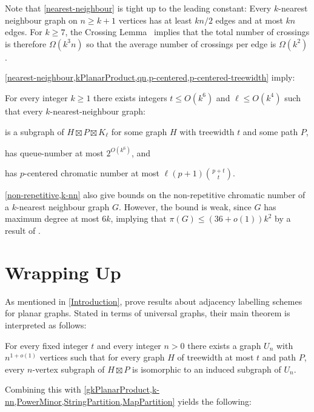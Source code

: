 \documentclass{patmorin}
\renewcommand{\ge}{\geqslant}
\renewcommand{\geq}{\geqslant}
\renewcommand{\leq}{\leqslant}
\begin{document}
Note that \cref{nearest-neighbour} is tight up to the leading constant:  Every $k$-nearest neighbour graph on $n\ge k+1$ vertices has at least $kn/2$ edges and at most $kn$ edges.  For $k\ge 7$, the Crossing Lemma~\citep{ajtai.chvatal.ea:crossing-free,leighton:complexity} implies that the total number of crossings is therefore $\Omega(k^3n)$ so that the average number of crossings per edge is $\Omega(k^2)$.

\cref{nearest-neighbour,kPlanarProduct,qn,p-centered,p-centered-treewidth} imply:

\begin{cor}
\label{k-nn}
For every integer $k\geq 1$ there exists integers $t\leq O(k^6)$ and $\ell\leq O(k^4)$ such that every $k$-nearest-neighbour graph:
\begin{compactitem}
\item is a subgraph of $H\boxtimes P \boxtimes K_\ell$ for some graph $H$ with treewidth $t$ and some path $P$, 
\item has queue-number at most $2^{O(k^6)}$, and
\item has $p$-centered chromatic number at most $\ell (p+1)\binom{p+t}{t}$.
\end{compactitem}
\end{cor}

\cref{non-repetitive,k-nn} also give bounds on the non-repetitive chromatic number of a $k$-nearest neighbour graph $G$. However, the bound is weak, since $G$ has maximum degree at most $6k$, implying that $\pi(G) \leq (36+o(1))k^2$ by a result of \citet{DJKW16}.

\section{Wrapping Up}

As mentioned in \cref{Introduction}, \citet{DEJGMM} prove results about adjacency labelling schemes for planar graphs. Stated in terms of universal graphs, their main theorem is interpreted as follows:

\begin{thm}
	\label{Universal}
	For every fixed integer $t$ and every integer $n>0$ there exists a
	graph $U_n$ with $n^{1+o(1)}$ vertices such that for every graph $H$ of
	treewidth at most $t$ and path $P$, every $n$-vertex subgraph of $H\boxtimes P$ is isomorphic to an induced subgraph of $U_n$.
\end{thm}

Combining this with \cref{gkPlanarProduct,k-nn,PowerMinor,StringPartition,MapPartition} yields the following:
\end{document}
